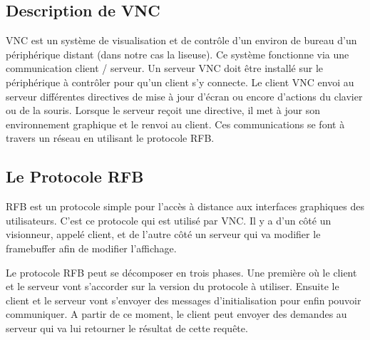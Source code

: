 \subsection{Description de VNC}

VNC est un système de visualisation et de contrôle d'un environ de bureau d'un périphérique distant (dans notre cas la liseuse). Ce système fonctionne via une communication client / serveur. Un serveur VNC doit être installé sur le périphérique à contrôler pour qu'un client s'y connecte. Le client VNC envoi au serveur différentes directives de mise à jour d'écran ou encore d'actions du clavier ou de la souris. Lorsque le serveur reçoit une directive, il met à jour son environnement graphique et le renvoi au client. Ces communications se font à travers un réseau en utilisant le protocole RFB.

\subsection{Le Protocole RFB}

RFB est un protocole simple pour l'accès à distance aux interfaces graphiques des utilisateurs. C'est ce protocole qui est utilisé par VNC. Il y a d'un côté un visionneur, appelé client, et de l'autre côté un serveur qui va modifier le framebuffer afin de modifier l'affichage.

Le protocole RFB peut se décomposer en trois phases. Une première où le client et le serveur vont s'accorder sur la version du protocole à utiliser. Ensuite le client et le serveur vont s'envoyer des messages d'initialisation pour enfin pouvoir communiquer. A partir de ce moment, le client peut envoyer des demandes au serveur qui va lui retourner le résultat de cette requête.


